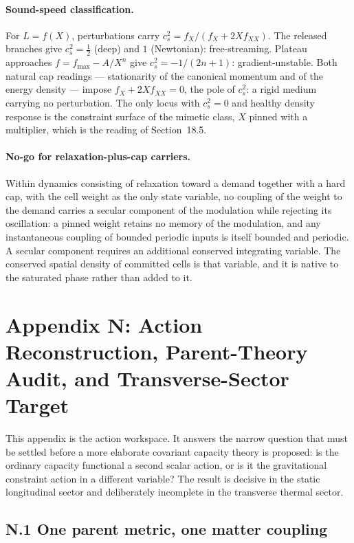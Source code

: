 \documentclass[11pt]{article}
\begin{document}
\paragraph{Sound-speed classification.} For $L=f(X)$, perturbations carry $c_s^2=f_X/(f_X+2Xf_{XX})$. The released branches give $c_s^2=\tfrac12$ (deep) and $1$ (Newtonian): free-streaming. Plateau approaches $f=f_{\max}-A/X^n$ give $c_s^2=-1/(2n{+}1)$: gradient-unstable. Both natural cap readings --- stationarity of the canonical momentum and of the energy density --- impose $f_X+2Xf_{XX}=0$, the pole of $c_s^2$: a rigid medium carrying no perturbation. The only locus with $c_s^2=0$ and healthy density response is the constraint surface of the mimetic class, $X$ pinned with a multiplier, which is the reading of Section~18.5.

\paragraph{No-go for relaxation-plus-cap carriers.} Within dynamics consisting of relaxation toward a demand together with a hard cap, with the cell weight as the only state variable, no coupling of the weight to the demand carries a secular component of the modulation while rejecting its oscillation: a pinned weight retains no memory of the modulation, and any instantaneous coupling of bounded periodic inputs is itself bounded and periodic. A secular component requires an additional conserved integrating variable. The conserved spatial density of committed cells is that variable, and it is native to the saturated phase rather than added to it.

\section*{Appendix N: Action Reconstruction, Parent-Theory Audit, and Transverse-Sector Target}

This appendix is the action workspace. It answers the narrow question that must be settled before a more elaborate covariant capacity theory is proposed: is the ordinary capacity functional a second scalar action, or is it the gravitational constraint action in a different variable? The result is decisive in the static longitudinal sector and deliberately incomplete in the transverse thermal sector.

\subsection*{N.1 One parent metric, one matter coupling}
\end{document}
